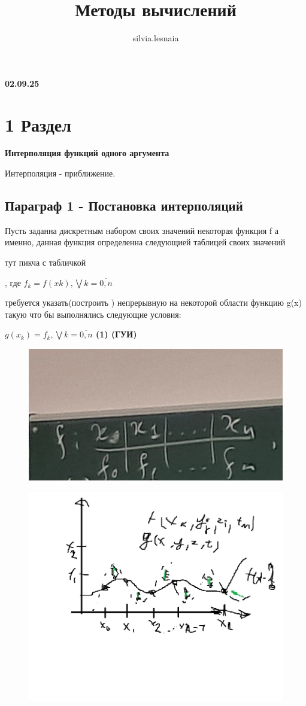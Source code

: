 \documentclass{article}
\title{Методы вычислений}
\author{silvia.lesnaia }
\begin{document}
\maketitle

\textbf{02.09.25}

\section{1 Раздел}
\textbf{Интерполяция функций одного аргумента}

Интерполяция - приближение.

\subsection{Параграф 1 - Постановка интерполяций}

Пусть заданна дискретным набором своих значений некоторая функция f 
а именно, данная функция определенна следующией таблицей своих значений 

тут пикча с табличкой 


, где $f_k=f(xk),\bigvee k =\overline{0,n} $

требуется указать(построить ) непрерывную на некоторой области функцию g(x)
такую что бы выполнялись следующие условия:  

\textbf{$g(x_k)=f_k,\bigvee k =\overline{0,n}$ (1) (ГУИ)}

\begin{figure} [H]
    \includegraphics[width=0.50\linewidth]{photo_5310113942493852121_y.jpg}
\end{figure}

\begin{figure} [H]
    \includegraphics[width=0.80\linewidth]{Без имени.png}
\end{figure}
\end{document}
